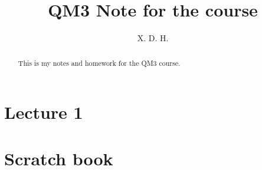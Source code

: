 \documentclass[12pt]{article}
\begin{document}
\title{\boldmath QM3 Note for the course}
\author{X. D. H.}

\maketitle

\begin{abstract}
  This is my notes and homework for the QM3 course.
\end{abstract}

\tableofcontents
\section{Lecture 1}\label{sec:Lecture 1} %


\section{Scratch book}\label{sec:Scratch book} %

\end{document}
